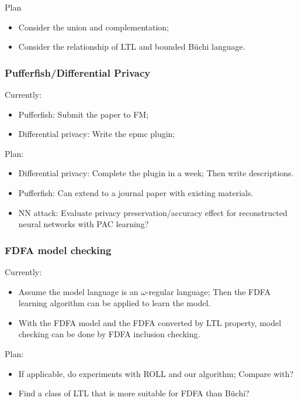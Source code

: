 \documentclass[aspectratio=1610, 13pt]{beamer}
\newcommand{\buchi}{B\"uchi }
\begin{document}
    

\begin{frame}{Plan}
    
    \begin{itemize}
        \item Consider the union and complementation;
        \item Consider the relationship of LTL and bounded \buchi language.
\end{itemize}    
\end{frame}


\begin{frame}\frametitle{Pufferfish/Differential Privacy}
Currently:
\begin{itemize}
  \item Pufferfish: Submit the paper to FM;
  \item Differential privacy: Write the epmc plugin;
\end{itemize}
Plan:
\begin{itemize}
  \item Differential privacy: Complete the plugin in a week; Then write descriptions.
  \item Pufferfish: Can extend to a journal paper with existing materials. 
  \item NN attack: Evaluate privacy preservation/accuracy effect for reconstructed neural networks with PAC learning? 
\end{itemize}
\end{frame}

\begin{frame}\frametitle{FDFA model checking}
Currently:
\begin{itemize}
  \item Assume the model language is an $\omega$-regular language; Then the FDFA learning algorithm can be applied to learn the model.
  \item With the FDFA model and the FDFA converted by LTL property, model checking can be done by FDFA inclusion checking.
\end{itemize}
Plan:
\begin{itemize}
  \item If applicable, do experiments with ROLL and our algorithm; Compare with?
  \item Find a class of LTL that is more suitable for FDFA than B\"uchi? 
\end{itemize}

\end{frame}
\end{document}
